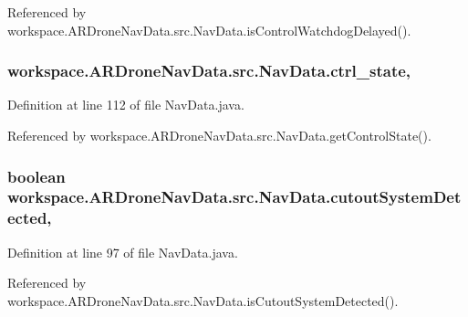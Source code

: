 Referenced by workspace.\+A\+R\+Drone\+Nav\+Data.\+src.\+Nav\+Data.\+is\+Control\+Watchdog\+Delayed().

\hypertarget{classworkspace_1_1_a_r_drone_nav_data_1_1src_1_1_nav_data_a4dad3c2d984a9b096d1c04f9f0168a54}{}
\subsubsection[{ctrl\+\_\+state}]{ workspace.\+A\+R\+Drone\+Nav\+Data.\+src.\+Nav\+Data.\+ctrl\+\_\+state\hspace{0.3cm}{\ttfamily [static]}, {\ttfamily [protected]}}\label{classworkspace_1_1_a_r_drone_nav_data_1_1src_1_1_nav_data_a4dad3c2d984a9b096d1c04f9f0168a54}


Definition at line 112 of file Nav\+Data.\+java.



Referenced by workspace.\+A\+R\+Drone\+Nav\+Data.\+src.\+Nav\+Data.\+get\+Control\+State().

\hypertarget{classworkspace_1_1_a_r_drone_nav_data_1_1src_1_1_nav_data_a318c458394227bf6c3aa1e063a28adcb}{}
\subsubsection[{cutout\+System\+Detected}]{\setlength{\rightskip}{0pt plus 5cm}boolean workspace.\+A\+R\+Drone\+Nav\+Data.\+src.\+Nav\+Data.\+cutout\+System\+Detected\hspace{0.3cm}{\ttfamily [static]}, {\ttfamily [protected]}}\label{classworkspace_1_1_a_r_drone_nav_data_1_1src_1_1_nav_data_a318c458394227bf6c3aa1e063a28adcb}


Definition at line 97 of file Nav\+Data.\+java.



Referenced by workspace.\+A\+R\+Drone\+Nav\+Data.\+src.\+Nav\+Data.\+is\+Cutout\+System\+Detected().

